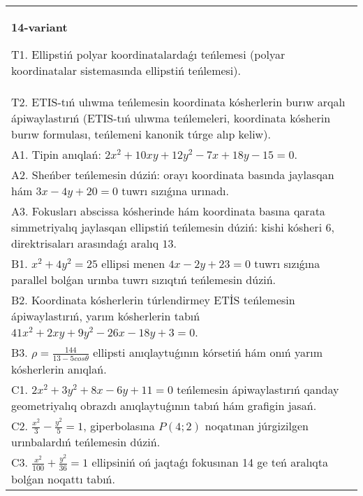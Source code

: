 \documentclass{article}
\begin{document}
\begin{tabular}{m{17cm}}
\textbf{14-variant}
\newline

T1. Ellipstiń polyar koordinatalardaǵı teńlemesi (polyar koordinatalar sistemasında ellipstiń teńlemesi).\\

T2. ETIS-tıń ulıwma teńlemesin koordinata kósherlerin burıw arqalı ápiwaylastırıń (ETIS-tıń ulıwma teńlemeleri, koordinata kósherin burıw formulası, teńlemeni kanonik túrge alıp keliw).\\

A1. Tipin anıqlań: $2 x^{2}+10 xy+12 y^{2}-7 x+18 y-15=0$.\\

A2. Sheńber teńlemesin dúziń: orayı koordinata basında jaylasqan hám $3 x-4 y+20=0$ tuwrı sızıǵına urınadı.\\

A3. Fokusları abscissa kósherinde hám koordinata basına qarata simmetriyalıq jaylasqan ellipstiń teńlemesin dúziń: kishi kósheri $6$, direktrisaları arasındaǵı aralıq $13$.\\

B1. $x^{2} + 4y^{2} = 25$ ellipsi menen $4x - 2y + 23 = 0$ tuwrı sızıǵına parallel bolǵan urınba tuwrı sızıqtıń teńlemesin dúziń.  \\

B2. Koordinata kósherlerin túrlendirmey ETİS teńlemesin ápiwaylastırıń, yarım kósherlerin tabıń $41x^{2} + 2xy + 9y^{2} - 26x - 18y + 3 = 0$.  \\

B3. $\rho = \frac{144}{13 - 5cos\theta}$ ellipsti anıqlaytuǵının kórsetiń hám onıń yarım kósherlerin anıqlań.\\

C1. $2x^{2} + 3y^{2} + 8x - 6y + 11 = 0$ teńlemesin ápiwaylastırıń qanday geometriyalıq obrazdı anıqlaytuǵının tabıń hám grafigin jasań.  \\

C2. $\frac{x^{2}}{3} - \frac{y^{2}}{5} = 1$, giperbolasına $P(4;2)$ noqatınan júrgizilgen urınbalardıń teńlemesin dúziń.  \\

C3. $\frac{x^{2}}{100} + \frac{y^{2}}{36} = 1$ ellipsiniń oń jaqtaǵı fokusınan 14 ge teń aralıqta bolǵan noqattı tabıń.  \\

\end{tabular}
\vspace{1cm}
\end{document}

